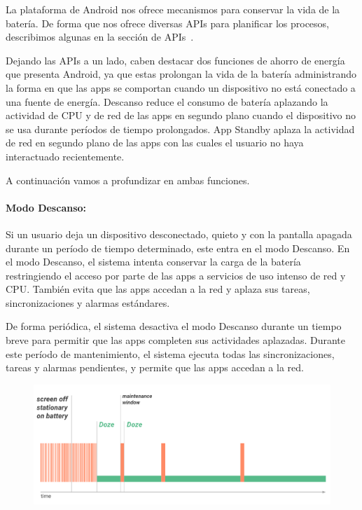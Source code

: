 

La plataforma de Android nos ofrece mecanismos para conservar
 la vida de la batería. De forma que nos ofrece diversas APIs para
 planificar los procesos, describimos algunas en la sección de APIs~\cite{jobdispatcher}.

Dejando las APIs a un lado, caben destacar  dos funciones de
 ahorro de energía que presenta Android, ya que estas prolongan 
la vida de la batería administrando la forma en que las apps se 
comportan cuando un dispositivo no está conectado a una 
fuente de energía. Descanso reduce el consumo de batería
 aplazando la actividad de CPU y de red de las apps en segundo
 plano cuando el dispositivo no se usa durante períodos de
 tiempo prolongados. App Standby aplaza la actividad de red 
en segundo plano de las apps con las cuales el usuario no haya
 interactuado recientemente.

A continuación vamos a profundizar en ambas funciones.

\paragraph{Modo Descanso:}

Si un usuario deja un dispositivo desconectado, quieto y con la 
pantalla apagada durante un período de tiempo determinado, este 
entra en el modo Descanso. En el modo Descanso, el sistema intenta 
conservar la carga de la batería restringiendo el acceso por parte de
 las apps a servicios de uso intenso de red y CPU. También evita que
 las apps accedan a la red y aplaza sus tareas, sincronizaciones
 y alarmas estándares.

De forma periódica, el sistema desactiva el modo Descanso durante 
un tiempo breve para permitir que las apps completen sus actividades 
aplazadas. Durante este período de mantenimiento, el sistema ejecuta
 todas las sincronizaciones, tareas y alarmas pendientes, y permite 
que las apps accedan a la red.
\begin{figure}[h]
\includegraphics[scale=0.20]{imagenes/doze.png} 
\end{figure}



